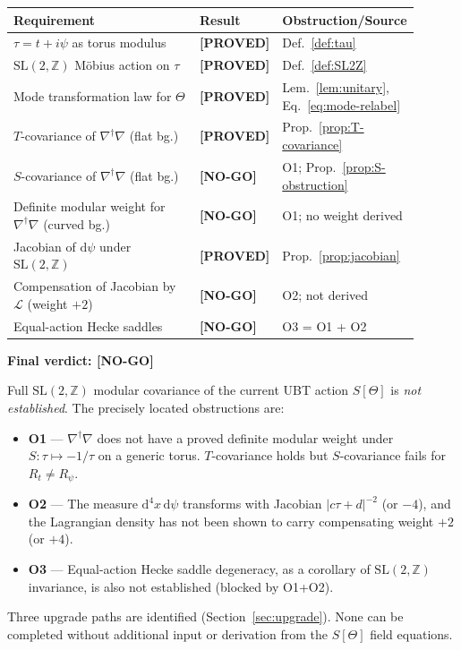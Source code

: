 \documentclass[12pt,a4paper]{article}
\theoremstyle{definition}
\theoremstyle{remark}
\newcommand{\PROVED}{\textcolor{green!50!black}{\textbf{[PROVED]}}}
\newcommand{\NOGO}{\textcolor{red!80!black}{\textbf{[NO-GO]}}}
\newcommand{\SL}{\mathrm{SL}}
\newcommand{\ZZ}{\mathbb{Z}}
\newcommand{\dd}{\mathrm{d}}
\begin{document}
\begin{center}
\renewcommand{\arraystretch}{1.45}
\begin{longtable}{@{}p{0.56\linewidth}p{0.10\linewidth}p{0.24\linewidth}@{}}
\toprule
Requirement & Result & Obstruction/Source \\
\midrule
$\tau=t+i\psi$ as torus modulus
  & \PROVED & Def.~\ref{def:tau} \\
$\SL(2,\ZZ)$ Möbius action on $\tau$
  & \PROVED & Def.~\ref{def:SL2Z} \\
Mode transformation law for $\Theta$
  & \PROVED & Lem.~\ref{lem:unitary}, Eq.~\eqref{eq:mode-relabel} \\
$T$-covariance of $\nabla^\dagger\nabla$ (flat bg.)
  & \PROVED & Prop.~\ref{prop:T-covariance} \\
$S$-covariance of $\nabla^\dagger\nabla$ (flat bg.)
  & \NOGO & O1; Prop.~\ref{prop:S-obstruction} \\
Definite modular weight for $\nabla^\dagger\nabla$ (curved bg.)
  & \NOGO & O1; no weight derived \\
Jacobian of $\dd\psi$ under $\SL(2,\ZZ)$
  & \PROVED & Prop.~\ref{prop:jacobian} \\
Compensation of Jacobian by $\mathcal L$ (weight $+2$)
  & \NOGO & O2; not derived \\
Equal-action Hecke saddles
  & \NOGO & O3 = O1 + O2 \\
\bottomrule
\end{longtable}
\end{center}

\begin{warnbox}
\textbf{Final verdict: \NOGO}

\medskip
Full $\SL(2,\ZZ)$ modular covariance of the current UBT action $S[\Theta]$
is \emph{not established}.  The precisely located obstructions are:

\begin{itemize}
\item \textbf{O1} — $\nabla^\dagger\nabla$ does not have a proved definite
  modular weight under $S:\tau\mapsto -1/\tau$ on a generic torus.
  $T$-covariance holds but $S$-covariance fails for $R_t\ne R_\psi$.
\item \textbf{O2} — The measure $\dd^4x\,\dd\psi$ transforms with Jacobian
  $|c\tau+d|^{-2}$ (or $-4$), and the Lagrangian density has not been
  shown to carry compensating weight $+2$ (or $+4$).
\item \textbf{O3} — Equal-action Hecke saddle degeneracy, as a corollary of
  $\SL(2,\ZZ)$ invariance, is also not established (blocked by O1+O2).
\end{itemize}

\medskip
Three upgrade paths are identified (Section~\ref{sec:upgrade}).  None can
be completed without additional input or derivation from the $S[\Theta]$
field equations.
\end{warnbox}
\end{document}
